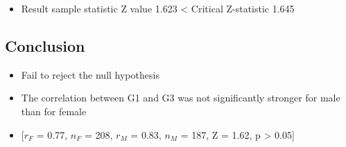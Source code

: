 \documentclass[
]{article}
\providecommand{\tightlist}{%
  \setlength{\itemsep}{0pt}\setlength{\parskip}{0pt}}
\begin{document}
\begin{itemize}
\tightlist
\item
  Result sample statistic Z value 1.623 \textless{} Critical Z-statistic
  1.645\\
\end{itemize}

\hypertarget{conclusion}{%
\subsection{Conclusion}\label{conclusion}}

\begin{itemize}
\tightlist
\item
  Fail to reject the null hypothesis\\
\item
  The correlation between G1 and G3 was not significantly stronger for
  male than for female\\
\item
  {[}\(r_{F}\) = 0.77, \(n_{F}\) = 208, \(r_{M}\) = 0.83, \(n_{M}\) =
  187, Z = 1.62, p \textgreater{} 0.05{]}
\end{itemize}
\end{document}
